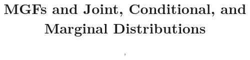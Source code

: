 \documentclass[11.5pt]{article}
\title{MGFs and Joint, Conditional, and Marginal Distributions}
\author{\justin, \creds}
\begin{document}
\maketitle

\begin{notes}

\begin{comment}
\section*{Exponential Distribution (Continuous)}

Let us say that $X$ is distributed $\Expo(\lambda)$. We know the following:
\begin{description}
	\item[Story] You're sitting on an open meadow right before the break of dawn, wishing that airplanes in the night sky were shooting stars, because you could really use a wish right now. You know that shooting stars come on average every 15 minutes, but it's never true that a shooting star is ever "due" to come because you've waited so long. Your waiting time is memorylessness, which means that the time until the next shooting star comes does not depend on how long you've waited already.
	
	\item[Example] The waiting time until the next shooting star is distributed $\Expo(4)$. The 4 here is $\lambda$, or the rate parameter, or how many shooting stars we expect to see in a unit of time. The expected time until the next shooting star is $\frac{1}{\lambda}$, or $\frac{1}{4}$ of an hour. You can expect to wait 15 minutes until the next shooting star.
	
	\item[All Exponentials are Scaled Versions of Each Other]
		\[Y \sim \Expo(\lambda) \rightarrow X = \lambda Y \sim \Expo(1)\]
	 
	\item[PDF and CDF] The PDF and CDF of a Exponential is:
\begin{eqnarray*}
f(x) = \lambda e^{-\lambda x},
\hspace{.1 in}
x \in [0, \infty)
\hspace{1 in}
F(x) = P(X \leq x) = 1 - e^{-\lambda x},
\hspace{.1 in}
x \in [0, \infty)
\end{eqnarray*}
	


\end{comment}
\end{notes}
\end{document}

